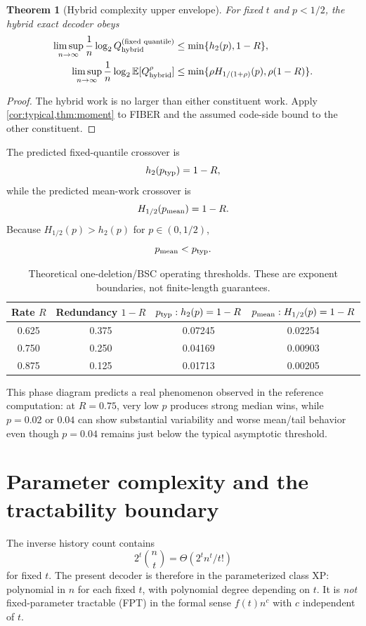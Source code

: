 \documentclass[11pt]{article}
\newtheorem{theorem}{Theorem}
\theoremstyle{definition}
\theoremstyle{remark}
\newcommand{\hbin}{h_2}
\newcommand{\Renyi}{H}
\begin{document}
\begin{theorem}[Hybrid complexity upper envelope]
\label{thm:hybrid}
For fixed $t$ and $p<1/2$, the hybrid exact decoder obeys
\begin{align}
\limsup_{n\to\infty}\frac1n\log_2 Q_{\rm hybrid}^{(\text{fixed quantile})}
&\le \min\{\hbin(p),1-R\},\\
\limsup_{n\to\infty}\frac1n\log_2\mathbb E[Q_{\rm hybrid}^{\rho}]
&\le \min\{\rho\Renyi_{1/(1+\rho)}(p),\rho(1-R)\}.
\end{align}
\end{theorem}
\begin{proof}
The hybrid work is no larger than either constituent work.  Apply \cref{cor:typical,thm:moment} to FIBER and the assumed code-side bound to the other constituent.
\end{proof}

The predicted fixed-quantile crossover is
\[
\hbin(p_{\rm typ})=1-R,
\]
while the predicted mean-work crossover is
\[
\Renyi_{1/2}(p_{\rm mean})=1-R.
\]
Because $\Renyi_{1/2}(p)>\hbin(p)$ for $p\in(0,1/2)$,
\[
p_{\rm mean}<p_{\rm typ}.
\]

\begin{table}[h]
\centering
\caption{Theoretical one-deletion/BSC operating thresholds.  These are exponent boundaries, not finite-length guarantees.}
\begin{tabular}{@{}cccc@{}}
\toprule
Rate $R$ & Redundancy $1-R$ & $p_{\rm typ}:\hbin(p)=1-R$ & $p_{\rm mean}:\Renyi_{1/2}(p)=1-R$ \\
\midrule
0.625 & 0.375 & 0.07245 & 0.02254 \\
0.750 & 0.250 & 0.04169 & 0.00903 \\
0.875 & 0.125 & 0.01713 & 0.00205 \\
\bottomrule
\end{tabular}
\end{table}

This phase diagram predicts a real phenomenon observed in the reference computation: at $R=0.75$, very low $p$ produces strong median wins, while $p=0.02$ or $0.04$ can show substantial variability and worse mean/tail behavior even though $p=0.04$ remains just below the typical asymptotic threshold.

\section{Parameter complexity and the tractability boundary}
The inverse history count contains
\[
2^t\binom nt=\Theta(2^t n^t/t!)
\]
for fixed $t$.  The present decoder is therefore in the parameterized class XP: polynomial in $n$ for each fixed $t$, with polynomial degree depending on $t$.  It is \emph{not} fixed-parameter tractable (FPT) in the formal sense $f(t)n^c$ with $c$ independent of $t$.
\end{document}
